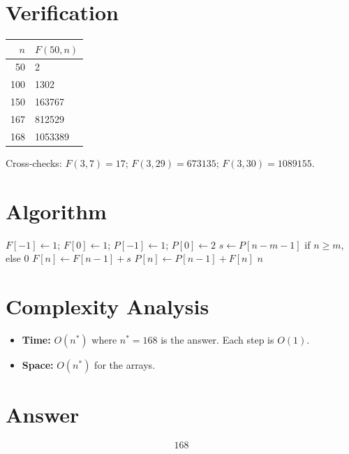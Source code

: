 \documentclass[12pt]{article}
\begin{document}
\section{Verification}

\begin{center}
\begin{tabular}{rl}
\toprule
$n$ & $F(50, n)$ \\
\midrule
50 & 2 \\
100 & 1302 \\
150 & 163767 \\
167 & 812529 \\
168 & 1053389 \\
\bottomrule
\end{tabular}
\end{center}

Cross-checks: $F(3, 7) = 17$; $F(3, 29) = 673135$; $F(3, 30) = 1089155$.

\section{Algorithm}

\begin{algorithm}[H]
\caption{Find least $n$ with $F(m, n) > \text{target}$}
\begin{algorithmic}[1]
\State $F[-1] \gets 1$; $F[0] \gets 1$; $P[-1] \gets 1$; $P[0] \gets 2$
    \State $s \gets P[n - m - 1]$ if $n \ge m$, else $0$
    \State $F[n] \gets F[n-1] + s$
    \State $P[n] \gets P[n-1] + F[n]$
        \State \Return $n$
    \EndIf
\EndFor
\end{algorithmic}
\end{algorithm}

\section{Complexity Analysis}

\begin{itemize}
\item \textbf{Time:} $O(n^*)$ where $n^* = 168$ is the answer. Each step is $O(1)$.
\item \textbf{Space:} $O(n^*)$ for the arrays.
\end{itemize}

\section{Answer}

\[
\boxed{168}
\]
\end{document}
